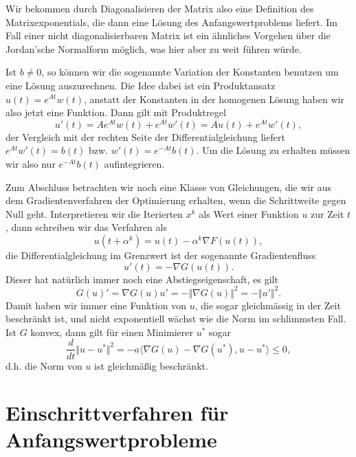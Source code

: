 Wir bekommen durch Diagonalisieren der Matrix also eine Definition des Matrixexponentials, die dann eine Lösung des Anfangswertproblems liefert. Im Fall einer nicht diagonalisierbaren Matrix ist ein ähnliches Vorgehen über die Jordan'sche Normalform möglich, was hier aber zu weit führen würde.

Ist $b \neq 0$, so können wir die sogenannte Variation der Konstanten benutzen um eine Lösung auszurechnen. Die Idee dabei ist ein Produktansatz $u(t) = e^{At} w(t)$, anstatt der Konstanten in der homogenen Lösung haben wir also jetzt eine Funktion. Dann gilt mit Produktregel
$$ u'(t) = A e^{At} w(t) + e^{At}w'(t) = Au(t) + e^{At}w'(t), $$
der Vergleich mit der rechten Seite der Differentialgleichung liefert $e^{At} w'(t) = b(t)$ bzw. $w'(t) = e^{-At} b(t). $
Um die Lösung zu erhalten müssen wir also nur $e^{-At} b(t)$ aufintegrieren. 

Zum Abschluss betrachten wir noch eine Klasse von Gleichungen, die wir aus dem Gradientenverfahren der Optimierung erhalten, wenn die Schrittweite gegen Null geht. Interpretieren wir die Iterierten $x^k$ als Wert einer Funktion $u$ zur Zeit $t$, dann schreiben wir das Verfahren als
$$ u(t+\alpha^k ) = u(t) - \alpha^k \nabla F(u(t)), $$
die Differentialgleichung im Grenzwert ist der sogenannte Gradientenfluss
$$ u'(t) = - \nabla G(u(t)). $$
Dieser hat natürlich immer noch eine Abstiegseigenschaft, es gilt 
$$ G(u)' =   \nabla G(u) u' = - \Vert \nabla G(u) \Vert^2 = - \Vert u'\Vert^2. $$ 
Damit haben wir immer eine Funktion von $u$, die sogar gleichmässig in der Zeit beschränkt ist, und nicht exponentiell wächst wie die Norm im schlimmsten Fall. Ist $G$ konvex, dann gilt für einen Minimierer $u^*$ sogar
$$ \frac{d}{dt} \Vert u - u^* \Vert^2 = - a \langle \nabla G(u) - \nabla G(u^*), u - u^* \rangle \leq 0, $$
d.h. die Norm von $u$ ist gleichmä{\ss}ig beschränkt. 

\section{Einschrittverfahren für Anfangswertprobleme} 

